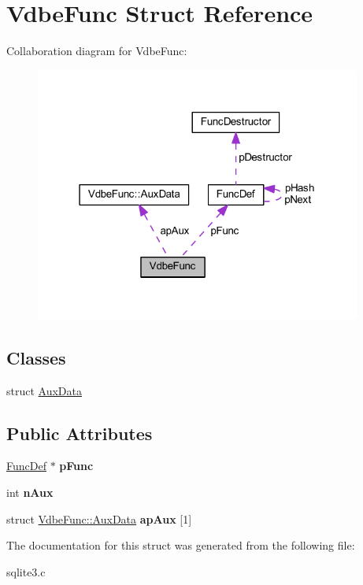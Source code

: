 \hypertarget{struct_vdbe_func}{\section{Vdbe\-Func Struct Reference}
\label{struct_vdbe_func}
}


Collaboration diagram for Vdbe\-Func\-:\nopagebreak
\begin{figure}[H]
\begin{center}
\leavevmode
\includegraphics[width=304pt]{struct_vdbe_func__coll__graph}
\end{center}
\end{figure}
\subsection*{Classes}
\begin{DoxyCompactItemize}
\item 
struct \hyperlink{struct_vdbe_func_1_1_aux_data}{Aux\-Data}
\end{DoxyCompactItemize}
\subsection*{Public Attributes}
\begin{DoxyCompactItemize}
\item 
\hypertarget{struct_vdbe_func_a73cbc96029bec2f37c7e2a79052a2f65}{\hyperlink{struct_func_def}{Func\-Def} $\ast$ {\bfseries p\-Func}}\label{struct_vdbe_func_a73cbc96029bec2f37c7e2a79052a2f65}

\item 
\hypertarget{struct_vdbe_func_ad78feda4c310ea0bc17b7bba53bccd3c}{int {\bfseries n\-Aux}}\label{struct_vdbe_func_ad78feda4c310ea0bc17b7bba53bccd3c}

\item 
\hypertarget{struct_vdbe_func_abb466d61a0d36b913418460e5922166a}{struct \hyperlink{struct_vdbe_func_1_1_aux_data}{Vdbe\-Func\-::\-Aux\-Data} {\bfseries ap\-Aux} \mbox{[}1\mbox{]}}\label{struct_vdbe_func_abb466d61a0d36b913418460e5922166a}

\end{DoxyCompactItemize}


The documentation for this struct was generated from the following file\-:\begin{DoxyCompactItemize}
\item 
sqlite3.\-c\end{DoxyCompactItemize}
